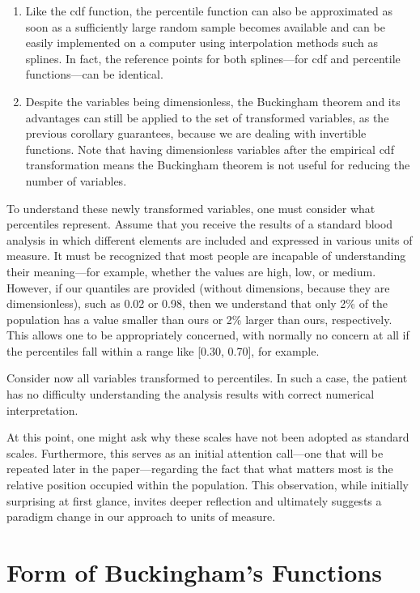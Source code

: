 \documentclass[
	11pt, %
	fleqn, %
	a4paper, %
]{LegrandOrangeBook}
\begin{document}
\begin{enumerate}
\item Like the cdf function, the percentile function can also be approximated as soon as a sufficiently large random sample becomes available and can be easily implemented on a computer using interpolation methods such as splines. In fact, the reference points for both splines---for cdf and percentile functions---can be identical.

\item Despite the variables being dimensionless, the Buckingham theorem and its advantages can still be applied to the set of transformed variables, as the previous corollary guarantees, because we are dealing with invertible functions. Note that having dimensionless variables after the empirical cdf transformation means the Buckingham theorem is not useful for reducing the number of variables.
\end{enumerate}

To understand these newly transformed variables, one must consider what percentiles represent. Assume that you receive the results of a standard blood analysis in which different elements are included and expressed in various units of measure. It must be recognized that most people are incapable of understanding their meaning---for example, whether the values are high, low, or medium. However, if our quantiles are provided (without dimensions, because they are dimensionless), such as 0.02 or 0.98, then we understand that only 2\% of the population has a value smaller than ours or 2\% larger than ours, respectively. This allows one to be appropriately concerned, with normally no concern at all if the percentiles fall within a range like [0.30, 0.70], for example.

Consider now all variables transformed to percentiles. In such a case, the patient has no difficulty understanding the analysis results with correct numerical interpretation.

At this point, one might ask why these scales have not been adopted as standard scales. Furthermore, this serves as an initial attention call---one that will be repeated later in the paper---regarding the fact that what matters most is the relative position occupied within the population. This observation, while initially surprising at first glance, invites deeper reflection and ultimately suggests a paradigm change in our approach to units of measure.


\chapter{Form of Buckingham's Functions}
\label{ch:Piforms}
\end{document}
